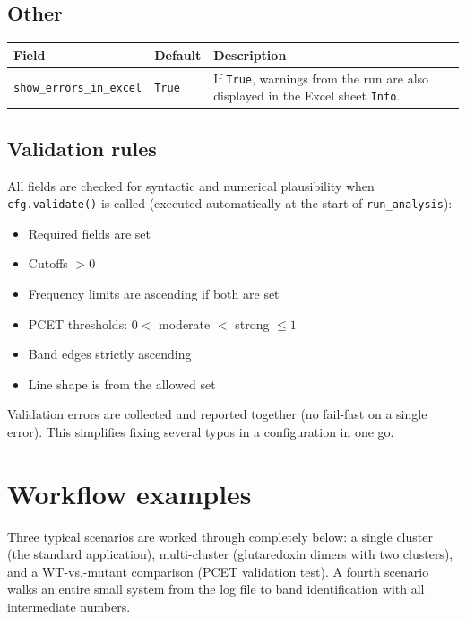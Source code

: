 \documentclass[11pt,a4paper,twoside]{article}
\theoremstyle{remark}
\begin{document}
\subsection{Other}

\begin{longtable}{p{} p{} p{}}
\toprule
\textbf{Field} & \textbf{Default} & \textbf{Description} \\
\midrule
\endhead
\texttt{show\_errors\_in\_excel} & \texttt{True} & If \texttt{True},
  warnings from the run are also displayed in the Excel sheet
  \texttt{Info}. \\
\bottomrule
\end{longtable}

\subsection{Validation rules}

All fields are checked for syntactic and numerical plausibility
when \texttt{cfg.validate()} is called (executed automatically at
the start of \texttt{run\_analysis}):

\begin{itemize}
  \item Required fields are set
  \item Cutoffs $> 0$
  \item Frequency limits are ascending if both are set
  \item PCET thresholds: $0 < $ moderate $< $ strong $\leq 1$
  \item Band edges strictly ascending
  \item Line shape is from the allowed set
\end{itemize}

Validation errors are collected and reported together (no
fail-fast on a single error). This simplifies fixing several
typos in a configuration in one go.

\section{Workflow examples}
\label{sec:workflow}

Three typical scenarios are worked through completely below: a
single cluster (the standard application), multi-cluster
(glutaredoxin dimers with two clusters), and a WT-vs.-mutant
comparison (PCET validation test). A fourth scenario walks an
entire small system from the log file to band identification with
all intermediate numbers.
\end{document}
